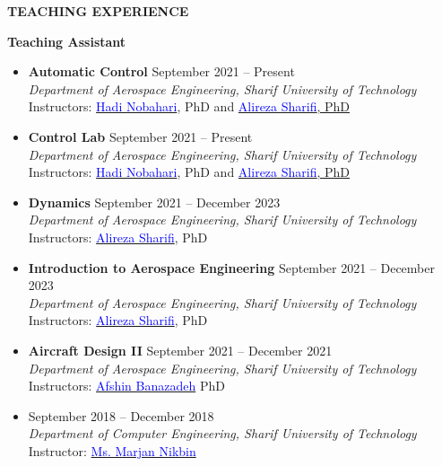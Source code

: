 \documentclass[12pt]{article}
\begin{document}
\begin{center}
	{\noindent \bfseries TEACHING EXPERIENCE}
\end{center}
{\bfseries Teaching Assistant}
\begin{itemize}
	\item {\bfseries Automatic Control}
	 \hfill September 2021 -- Present \\
	\textit{Department of Aerospace Engineering, Sharif University of Technology}\\
	Instructors: \href{https://ae.sharif.edu/~portal/faculty/1091235256}{\textcolor{blue}{Hadi Nobahari}}, PhD and \href{https://ae.sharif.edu/~portal/faculty/1730782165}{\textcolor{blue}{Alireza Sharifi}, PhD}
	\item {\bfseries Control Lab}
	 \hfill September 2021 -- Present \\
	\textit{Department of Aerospace Engineering, Sharif University of Technology}\\
	Instructors: \href{https://ae.sharif.edu/~portal/faculty/1091235256}{\textcolor{blue}{Hadi Nobahari}}, PhD and \href{https://ae.sharif.edu/~portal/faculty/1730782165}{\textcolor{blue}{Alireza Sharifi}, PhD}
	\item {\bfseries Dynamics}
	 \hfill September 2021 -- December 2023 \\
	\textit{Department of Aerospace Engineering, Sharif University of Technology}\\
	Instructors: \href{https://ae.sharif.edu/~portal/faculty/1730782165}{\textcolor{blue}{Alireza Sharifi}}, PhD
	\item {\bfseries Introduction to Aerospace Engineering}
	 \hfill September 2021 -- December 2023 \\
	\textit{Department of Aerospace Engineering, Sharif University of Technology}\\
	Instructors: \href{https://ae.sharif.edu/~portal/faculty/1730782165}{\textcolor{blue}{Alireza Sharifi}}, PhD
	\item {\bfseries Aircraft Design II}
	\hfill September 2021 -- December 2021 \\
   \textit{Department of Aerospace Engineering, Sharif University of Technology}\\
   Instructors: \href{http://ae.sharif.edu/~portal/faculty/1014037799}{\textcolor{blue}{Afshin Banazadeh}} PhD
	\item {}
	\hfill September 2018 -- December 2018 \\
   \textit{Department of Computer Engineering, Sharif University of Technology}\\
   \noindent Instructor: \href{https://www.linkedin.com/in/marjan-nikbin-a27451111}{\textcolor{blue}{Ms. Marjan Nikbin}}


\end{itemize}
\end{document}
